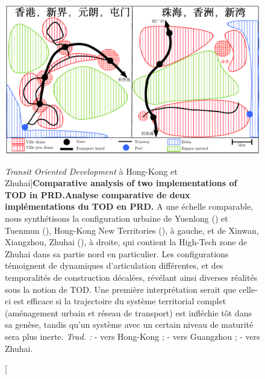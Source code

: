 \begin{figure}
	\includegraphics[width=\linewidth]{Figures/Final/1-3-1-fig-qualitative-schema.pdf}
	\caption[TOD in Hong-Kong and Zhuhai][\emph{Transit Oriented Development} à Hong-Kong et Zhuhai]{\textbf{Comparative analysis of two implementations of TOD in PRD.}\label{fig:qualitative:schema}}{\textbf{Analyse comparative de deux implémentations du TOD en PRD.} A une échelle comparable, nous synthétisons la configuration urbaine de Yuenlong () et Tuenmun (), Hong-Kong New Territories (), à gauche, et de Xinwan, Xiangzhou, Zhuhai (), à droite, qui contient la High-Tech zone de Zhuhai dans sa partie nord en particulier. Les configurations témoignent de dynamiques d'articulation différentes, et des temporalités de construction décalées, révélant ainsi diverses réalités sous la notion de TOD. Une première interprétation serait que celle-ci est efficace si la trajectoire du système territorial complet (aménagement urbain et réseau de transport) est infléchie tôt dans sa genèse, tandis qu'un système avec un certain niveau de maturité sera plus inerte. \textit{Trad. : }  - vers Hong-Kong ;  - vers Guangzhou ;  - vers Zhuhai.\label{fig:qualitative:schema}}
\end{figure}




